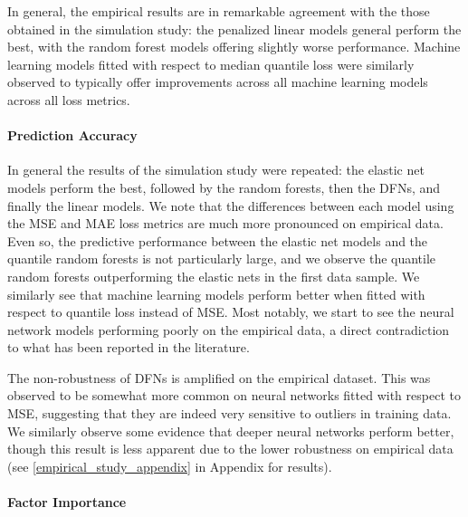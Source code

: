 \documentclass{article}
\begin{document}
In general, the empirical results are in remarkable agreement with the those obtained in the simulation study: the penalized linear models general perform the best, with the random forest models offering slightly worse performance. Machine learning models fitted with respect to median quantile loss were similarly observed to typically offer improvements across all machine learning models across all loss metrics. 

\paragraph{Prediction Accuracy}

In general the results of the simulation study were repeated: the elastic net models perform the best, followed by the random forests, then the DFNs, and finally the linear models. We note that the differences between each model using the MSE and MAE loss metrics are much more pronounced on empirical data. Even so, the predictive performance between the elastic net models and the quantile random forests is not particularly large, and we observe the quantile random forests outperforming the elastic nets in the first data sample. We similarly see that machine learning models perform better when fitted with respect to quantile loss instead of MSE. Most notably, we start to see the neural network models performing poorly on the empirical data, a direct contradiction to what has been reported in the literature.



The non-robustness of DFNs is amplified on the empirical dataset. This was observed to be somewhat more common on neural networks fitted with respect to MSE, suggesting that they are indeed very sensitive to outliers in training data. We similarly observe some evidence that deeper neural networks perform better, though this result is less apparent due to the lower robustness on empirical data (see \ref{empirical_study_appendix} in Appendix for results).


\paragraph{Factor Importance}
\end{document}
